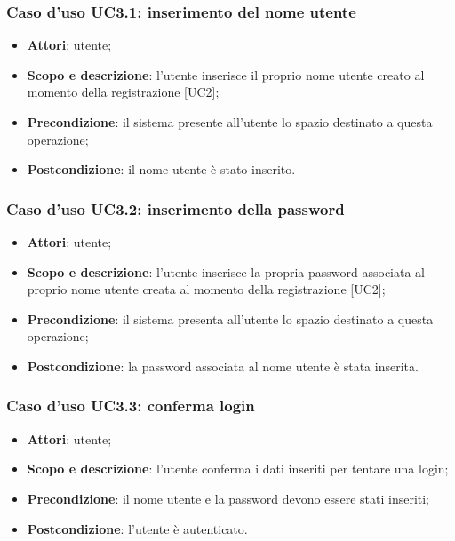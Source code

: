 \subsubsection{Caso d'uso UC3.1: inserimento del nome utente}
\begin{itemize}
	\item \textbf{Attori}: utente;
	\item \textbf{Scopo e descrizione}: l'utente inserisce il proprio nome utente creato al momento della registrazione [UC2];
	\item \textbf{Precondizione}: il sistema presente all'utente lo spazio destinato a questa operazione;
	\item \textbf{Postcondizione}: il nome utente è stato inserito.
\end{itemize}
\subsubsection{Caso d'uso UC3.2: inserimento della password}
\begin{itemize}
	\item \textbf{Attori}: utente;
	\item \textbf{Scopo e descrizione}: l'utente inserisce la propria password associata al proprio nome utente creata al momento della registrazione [UC2];
	\item \textbf{Precondizione}: il sistema presenta all'utente lo spazio destinato a questa operazione;
	\item \textbf{Postcondizione}: la password associata al nome utente è stata inserita.
\end{itemize}
\subsubsection{Caso d'uso UC3.3: conferma login}
\begin{itemize}
	\item \textbf{Attori}: utente;
	\item \textbf{Scopo e descrizione}: l'utente conferma i dati inseriti per tentare una login;
	\item \textbf{Precondizione}: il nome utente e la password devono essere stati inseriti;
	\item \textbf{Postcondizione}: l'utente è autenticato.
\end{itemize}